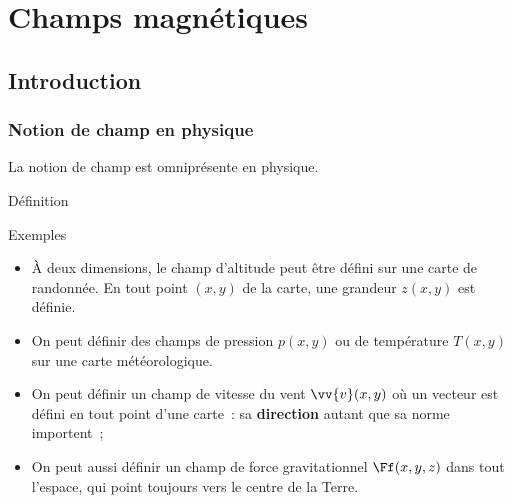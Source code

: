 \documentclass[../main/main.tex]{subfiles}
\begin{document}
\setcounter{chapter}{0}

\chapter{Champs magnétiques}
\section{Introduction}
\subsection{Notion de champ en physique}
La notion de champ est omniprésente en physique.
\begin{tdefi}{Définition}
\end{tdefi}
\begin{rexem}{Exemples}
	\begin{itemize}[label=$\diamond$, leftmargin=10pt]
		\item À deux dimensions, le champ d'altitude peut être défini sur une carte
		      de randonnée. En tout point $(x,y)$ de la carte, une grandeur $z(x,y)$ est
		      définie.
		\item On peut définir des champs de pression $p (x,y)$ ou de température
		      $T (x,y)$ sur une carte météorologique.
		\item On peut définir un champ de vitesse du vent $\vv{v}(x,y)$ où un vecteur
		      est défini en tout point d'une carte~: sa \textbf{direction} autant que sa
		      norme importent~;
		\item On peut aussi définir un champ de force gravitationnel $\Ff (x,y,z)$
		      dans tout l'espace, qui point toujours vers le centre de la Terre.
	\end{itemize}
\end{rexem}
\end{document}
